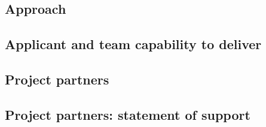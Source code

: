 \documentclass[12pt]{article}
\begin{document}
\begin{bibunit}

\putbib
\end{bibunit}

\pagebreak
\subsection{Approach}

\begin{bibunit}

\putbib
\end{bibunit}

\pagebreak
\subsection{Applicant and team capability to deliver}



\pagebreak
\subsection{Project partners}



\pagebreak
\subsection{Project partners: statement of support}


\end{document}
